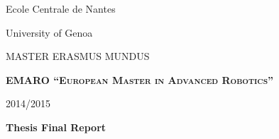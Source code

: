 \documentclass[11pt, openright]{Thesis} %
\begin{document}
\setcounter{tocdepth}{2}
\begin{titlepage}
\singlespacing
     \noindent \begin{minipage}{0.5\textwidth}
	\begin{flushleft} 
	{\large Ecole Centrale de Nantes}
	\end{flushleft}
	\end{minipage}
	\begin{minipage}{0.5\textwidth}
	\begin{flushright}
	{\large University of Genoa}
    \end{flushright}	 
	\end{minipage}
\begin{figure}[H]
\center
\end{figure}
	\begin{center}
	\vspace*{0.2in}
	{\Large MASTER ERASMUS MUNDUS}
	
	\vspace{0.2in}	\textbf{\textsc{EMARO  ``European Master in Advanced Robotics''}}
	
	\vspace{0.2in}	
	
	2014/2015
	
	\vspace{0.2in}
	
	\large \textbf{Thesis Final Report}
	
	\vspace{0.3in}
	

\end{center}
\end{titlepage}
\end{document}
